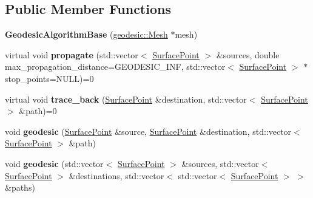 \subsection*{Public Member Functions}
\begin{DoxyCompactItemize}
\item 
\hypertarget{classgeodesic_1_1_geodesic_algorithm_base_a023f9fe21f67dbd0ed75be639f519c9c}{}{\bfseries Geodesic\+Algorithm\+Base} (\hyperlink{classgeodesic_1_1_mesh}{geodesic\+::\+Mesh} $\ast$mesh)\label{classgeodesic_1_1_geodesic_algorithm_base_a023f9fe21f67dbd0ed75be639f519c9c}

\item 
\hypertarget{classgeodesic_1_1_geodesic_algorithm_base_af1231184ca4215f90e5404dbfa05345e}{}virtual void {\bfseries propagate} (std\+::vector$<$ \hyperlink{classgeodesic_1_1_surface_point}{Surface\+Point} $>$ \&sources, double max\+\_\+propagation\+\_\+distance=G\+E\+O\+D\+E\+S\+I\+C\+\_\+\+I\+N\+F, std\+::vector$<$ \hyperlink{classgeodesic_1_1_surface_point}{Surface\+Point} $>$ $\ast$stop\+\_\+points=N\+U\+L\+L)=0\label{classgeodesic_1_1_geodesic_algorithm_base_af1231184ca4215f90e5404dbfa05345e}

\item 
\hypertarget{classgeodesic_1_1_geodesic_algorithm_base_a26d3226d68b102c74de5f8cca02472fe}{}virtual void {\bfseries trace\+\_\+back} (\hyperlink{classgeodesic_1_1_surface_point}{Surface\+Point} \&destination, std\+::vector$<$ \hyperlink{classgeodesic_1_1_surface_point}{Surface\+Point} $>$ \&path)=0\label{classgeodesic_1_1_geodesic_algorithm_base_a26d3226d68b102c74de5f8cca02472fe}

\item 
\hypertarget{classgeodesic_1_1_geodesic_algorithm_base_ad28b5eb5454e958c683647eb526543e4}{}void {\bfseries geodesic} (\hyperlink{classgeodesic_1_1_surface_point}{Surface\+Point} \&source, \hyperlink{classgeodesic_1_1_surface_point}{Surface\+Point} \&destination, std\+::vector$<$ \hyperlink{classgeodesic_1_1_surface_point}{Surface\+Point} $>$ \&path)\label{classgeodesic_1_1_geodesic_algorithm_base_ad28b5eb5454e958c683647eb526543e4}

\item 
\hypertarget{classgeodesic_1_1_geodesic_algorithm_base_afc459d5951c9be476c3997f225e09872}{}void {\bfseries geodesic} (std\+::vector$<$ \hyperlink{classgeodesic_1_1_surface_point}{Surface\+Point} $>$ \&sources, std\+::vector$<$ \hyperlink{classgeodesic_1_1_surface_point}{Surface\+Point} $>$ \&destinations, std\+::vector$<$ std\+::vector$<$ \hyperlink{classgeodesic_1_1_surface_point}{Surface\+Point} $>$ $>$ \&paths)\label{classgeodesic_1_1_geodesic_algorithm_base_afc459d5951c9be476c3997f225e09872}


\end{DoxyCompactItemize}
